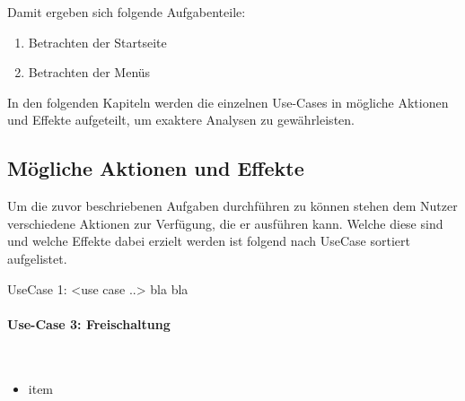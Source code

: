 Damit ergeben sich folgende Aufgabenteile:
\begin{enumerate}
	\item Betrachten der Startseite
	\item Betrachten der Menüs
\end{enumerate}


In den folgenden Kapiteln werden die einzelnen Use-Cases in mögliche Aktionen und Effekte aufgeteilt, um exaktere Analysen zu gewährleisten.

\subsection{Mögliche Aktionen und Effekte}
Um die zuvor beschriebenen Aufgaben durchführen zu können stehen dem Nutzer verschiedene Aktionen zur Verfügung, die er ausführen kann. Welche diese sind und welche Effekte dabei erzielt werden ist folgend nach UseCase sortiert aufgelistet.

UseCase 1: <use case ..>
bla bla

\paragraph{Use-Case 3: Freischaltung}\quad \\
\begin{itemize}
\item item

\end{itemize}

